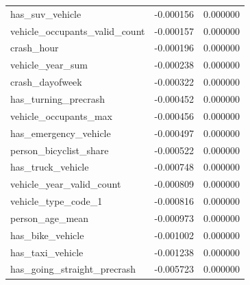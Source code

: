 \begin{tabular}{lrr}
has_suv_vehicle & -0.000156 & 0.000000 \\
vehicle_occupants_valid_count & -0.000157 & 0.000000 \\
crash_hour & -0.000196 & 0.000000 \\
vehicle_year_sum & -0.000238 & 0.000000 \\
crash_dayofweek & -0.000322 & 0.000000 \\
has_turning_precrash & -0.000452 & 0.000000 \\
vehicle_occupants_max & -0.000456 & 0.000000 \\
has_emergency_vehicle & -0.000497 & 0.000000 \\
person_bicyclist_share & -0.000522 & 0.000000 \\
has_truck_vehicle & -0.000748 & 0.000000 \\
vehicle_year_valid_count & -0.000809 & 0.000000 \\
vehicle_type_code_1 & -0.000816 & 0.000000 \\
person_age_mean & -0.000973 & 0.000000 \\
has_bike_vehicle & -0.001002 & 0.000000 \\
has_taxi_vehicle & -0.001238 & 0.000000 \\
has_going_straight_precrash & -0.005723 & 0.000000 \\
\bottomrule
\end{tabular}
